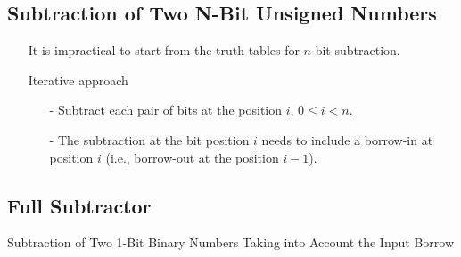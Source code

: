 \documentclass[12pt,openany, tikz,border=10pt]{book}
\begin{document}
			      	\subsection{Subtraction of Two N-Bit Unsigned Numbers}
			      	
			      	\begin{itemize}
			      		\item[] It is impractical to start from the truth tables for \( n \)-bit subtraction.
			      		\item[] Iterative approach
			      		      \begin{itemize}
			      		      	\item[-] Subtract each pair of bits at the position \( i \), \( 0 \leq i < n \).
			      		      	\item[-] The subtraction at the bit position \( i \) needs to include a borrow-in at position \( i \) (i.e., borrow-out at the position \( i - 1 \)).
			      		      \end{itemize}
			      	\end{itemize}
			      	
			      	\subsection{Full Subtractor}
			      	Subtraction of Two 1-Bit Binary Numbers Taking into Account the Input Borrow
			      	
\end{document}

